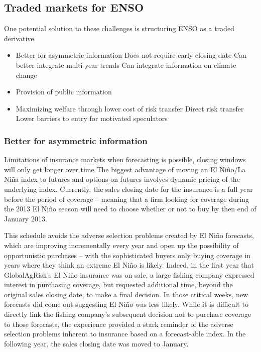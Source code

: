 \documentclass[authoryear]{article}
\begin{document}
\subsection{Traded markets for ENSO}
One potential solution to these challenges is structuring ENSO as a traded derivative.


\begin{itemize}
\item Better for asymmetric information
  \subitem Does not require early closing date
  \subitem Can better integrate multi-year trends
  \subitem Can integrate information on climate change
\item Provision of public information
\item Maximizing welfare through lower cost of risk transfer
  \subitem Direct risk transfer
  \subitem Lower barriers to entry for motivated speculators
\end{itemize}

\subsubsection{Better for asymmetric information} Limitations of insurance markets when forecasting is possible, closing windows will only get longer over time
The biggest advantage of moving an El Ni\~no/La Ni\~na index to futures and options-on futures involves dynamic pricing of the underlying index. Currently, the sales closing date for the insurance is a full year before the period of coverage – meaning that a firm looking for coverage during the 2013 El Ni\~no season will need to choose whether or not to buy by then end of January 2013. 

This schedule avoids the adverse selection problems created by El Ni\~no forecasts, which are improving incrementally every year and open up the possibility of opportunistic purchases – with the sophisticated buyers only buying coverage in years where they think an extreme El Ni\~no is likely. Indeed, in the first year that GlobalAgRisk’s El Ni\~no insurance was on sale, a large fishing company expressed interest in purchasing coverage, but requested additional time, beyond the original sales closing date, to make a final decision. In those critical weeks, new forecasts did come out suggesting El Ni\~no was less likely. While it is difficult to directly link the fishing company's subsequent decision not to purchase coverage to those forecasts, the experience provided a stark reminder of the adverse selection problems inherent to insurance based on a forecast-able index. In the following year, the sales closing date was moved to January. 
\end{document}
